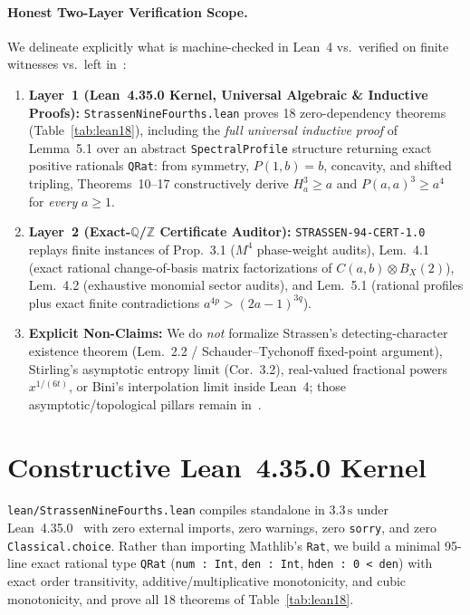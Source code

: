 \documentclass[10pt,twocolumn]{article}
\newcommand{\QQ}{\mathbb{Q}}
\newcommand{\ZZ}{\mathbb{Z}}
\begin{document}
\paragraph{Honest Two-Layer Verification Scope.}
We delineate explicitly what is machine-checked in Lean~4 vs.\ verified on finite witnesses vs.\ left in~\cite{openai2026omega94upper}:
\begin{enumerate}[leftmargin=1.3em,itemsep=1pt,topsep=2pt]
  \item \textbf{Layer~1 (Lean~4.35.0 Kernel, Universal Algebraic \& Inductive Proofs):} \texttt{StrassenNineFourths.lean} proves 18 zero-dependency theorems (Table~\ref{tab:lean18}), including the \emph{full universal inductive proof} of Lemma~5.1 over an abstract \texttt{SpectralProfile} structure returning exact positive rationals \texttt{QRat}: from symmetry, $P(1,b)=b$, concavity, and shifted tripling, Theorems~10--17 constructively derive $H_a^3 \ge a$ and $P(a,a)^3 \ge a^4$ for \emph{every} $a \ge 1$.
  \item \textbf{Layer~2 (Exact-$\QQ$/$\ZZ$ Certificate Auditor):} \texttt{STRASSEN-94-CERT-1.0} replays finite instances of Prop.~3.1 ($M^4$ phase-weight audits), Lem.~4.1 (exact rational change-of-basis matrix factorizations of $C(a,b)\otimes B_X(2)$), Lem.~4.2 (exhaustive monomial sector audits), and Lem.~5.1 (rational profiles plus exact finite contradictions $a^{4p} > (2a-1)^{3q}$).
  \item \textbf{Explicit Non-Claims:} We do \emph{not} formalize Strassen's detecting-character existence theorem (Lem.~2.2 / Schauder--Tychonoff fixed-point argument), Stirling's asymptotic entropy limit (Cor.~3.2), real-valued fractional powers $x^{1/(6t)}$, or Bini's interpolation limit inside Lean~4; those asymptotic/topological pillars remain in~\cite{openai2026omega94upper}.
\end{enumerate}

\section{Constructive Lean~4.35.0 Kernel}\label{sec:lean}
\texttt{lean/StrassenNineFourths.lean} compiles standalone in $3.3\,\mathrm{s}$ under Lean~4.35.0~\cite{demoura2021lean4} with zero external imports, zero warnings, zero \texttt{sorry}, and zero \texttt{Classical.choice}. Rather than importing Mathlib's \texttt{Rat}, we build a minimal 95-line exact rational type \texttt{QRat} (\texttt{num : Int}, \texttt{den : Int}, \texttt{hden : 0 < den}) with exact order transitivity, additive/multiplicative monotonicity, and cubic monotonicity, and prove all 18 theorems of Table~\ref{tab:lean18}.
\end{document}
